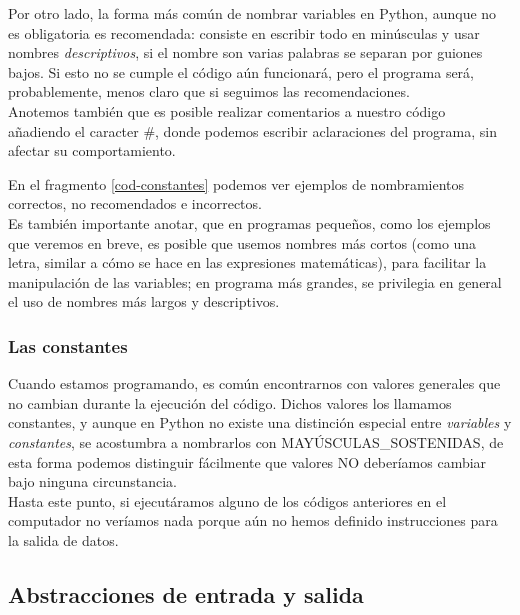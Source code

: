 Por otro lado, la forma más común de nombrar variables en Python, aunque no es obligatoria es recomendada: consiste en escribir todo en minúsculas y usar nombres \emph{descriptivos}, si el nombre son varias palabras se separan por guiones bajos. Si esto no se cumple el código aún funcionará, pero el programa será, probablemente, menos claro que si seguimos las recomendaciones. \\

Anotemos también que es posible realizar comentarios a nuestro código añadiendo el caracter \#, donde podemos escribir aclaraciones del programa, sin afectar su comportamiento.

En el fragmento \ref{cod-constantes} podemos ver ejemplos de nombramientos correctos, no recomendados e incorrectos. \\



Es también importante anotar, que en programas pequeños, como los ejemplos que veremos en breve, es posible que usemos nombres más cortos (como una letra, similar a cómo se hace en las expresiones matemáticas), para facilitar la manipulación de las variables; en programa más grandes, se privilegia en general el uso de nombres más largos y descriptivos.

\subsubsection{Las constantes}

Cuando estamos programando, es común encontrarnos con valores generales que no cambian durante la ejecución del código. Dichos valores los llamamos constantes, y aunque en Python no existe una distinción especial entre \emph{variables} y \emph{constantes}, se acostumbra a nombrarlos con MAYÚSCULAS\_SOSTENIDAS, de esta forma podemos distinguir fácilmente que valores NO deberíamos cambiar bajo ninguna circunstancia. \\



Hasta este punto, si ejecutáramos alguno de los códigos anteriores en el computador no veríamos nada porque aún no hemos definido instrucciones para la salida de datos.

\subsection{Abstracciones de entrada y salida}

